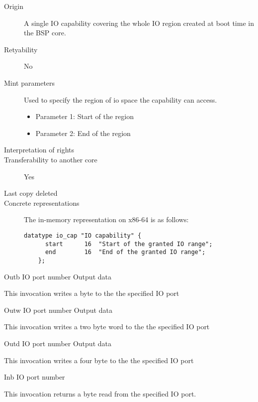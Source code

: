 \begin{description}
\item[Origin] A single IO capability covering the whole IO region created at
  boot time in the BSP core.
  
\item[Retyability] No
  
\item[Mint parameters] Used to specify the region of io space the capability can access.
  \begin{itemize}
  \item Parameter 1: Start of the region
  \item Parameter 2: End of the region
  \end{itemize}
  
\item[Interpretation of rights] 
  
\item[Transferability to another core] Yes

\item[Last copy deleted] 
  
\item[Concrete representations] The in-memory representation on x86-64 is as follows:
  
  \begin{lstlisting}[language=Mackerel]
    datatype io_cap "IO capability" {
      start      16  "Start of the granted IO range";
      end        16  "End of the granted IO range";
    };
  \end{lstlisting}
\end{description}

\begin{invocation}{Outb}
  \arg IO port number
  \arg Output data
\end{invocation}
This invocation writes a byte to the the specified IO port

\begin{invocation}{Outw}
  \arg IO port number
  \arg Output data
\end{invocation}
This invocation writes a two byte word to the the specified IO port

\begin{invocation}{Outd}
  \arg IO port number
  \arg Output data
\end{invocation}
This invocation writes a four byte to the the specified IO port

\begin{invocation}{Inb}
  \arg IO port number
\end{invocation}
This invocation returns a byte read from the specified IO port.

